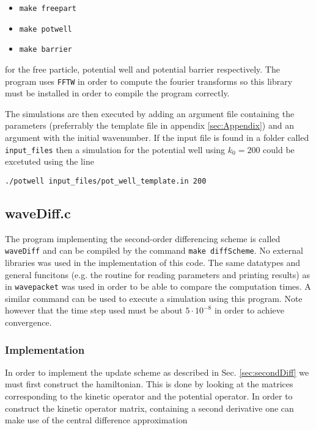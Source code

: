 \begin{itemize}
  \item \verb|make freepart|
  \item \verb|make potwell|
  \item \verb|make barrier|
\end{itemize}

for the free particle, potential well and potential barrier respectively. The program uses \verb|FFTW| in order to compute the fourier transforms so this library must be installed in order to compile the program correctly.

The simulations are then executed by adding an argument file containing the parameters (preferrably the template file in appendix \ref{sec:Appendix}) and an argument with the initial wavenumber. If the input file is found in a folder called \verb|input_files| then a simulation for the potential well using $k_0=200$ could be excetuted using the line

\verb|./potwell input_files/pot_well_template.in 200|

\subsection{waveDiff.c}
\label{sec:diffScheme}

The program implementing the second-order differencing scheme is called \verb|waveDiff| and can be compiled by the command \verb|make diffScheme|. No external libraries was used in the implementation of this code. The same datatypes and general funcitons (e.g. the routine for reading parameters and printing results) as in \verb|wavepacket| was used in order to be able to compare the computation times. A similar command can be used to execute a simulation using this program. Note however that the time step used must be about $5\cdot 10^{-8}$ in order to achieve convergence.

\subsubsection{Implementation}

In order to implement the update scheme as described in Sec. \ref{sec:secondDiff} we must first construct the hamiltonian. This is done by looking at the matrices corresponding to the kinetic operator and the potential operator. In order to construct the kinetic operator matrix, containing a second derivative one can make use of the central difference approximation

